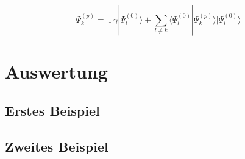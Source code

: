 \begin{refsection}
\[
\Psi_k^{(p)}
=
\imath\gamma|\Psi_l^{(0)}\rangle+
\displaystyle\sum_{l\neq k} \langle\Psi_l^{(0)}|\Psi_k^{(p)}\rangle
|\Psi_l^{(0)}\rangle
\]

\section{Auswertung}

\subsection{Erstes Beispiel}

\subsection{Zweites Beispiel}

\printbibliography[heading=subbibliography]
\end{refsection}

